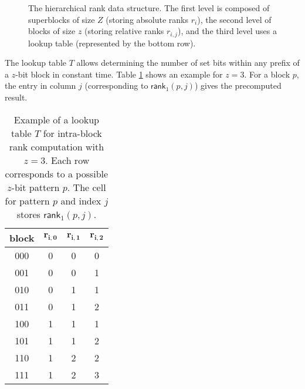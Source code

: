 \begin{figure}[hbtp]
\begin{flushright}
    \end{flushright}
    \caption{The hierarchical \textsf{rank} data structure. The first level is composed of superblocks of size $Z$ (storing absolute ranks $r_i$), the second level of blocks of size $z$ (storing relative ranks $r_{i,j}$), and the third level uses a lookup table (represented by the bottom row).} \label{fig:RRR}
\end{figure}


The lookup table $T$ allows determining the number of set bits within any prefix of a $z$-bit block in constant time. Table \ref{tab:lookup} shows an example for $z=3$. For a block $p$, the entry in column $j$ (corresponding to $\textsf{rank}_1(p, j)$) gives the precomputed result.

\begin{table}[h]
    \centering
    \begin{tabular}{|c|c|c|c|}
        \hline
        block & $\mathbf{r_{i,0}}$ & $\mathbf{r_{i,1}}$ & $\mathbf{r_{i,2}}$ \\
        \hline
        000   & 0                  & 0                  & 0                  \\
        001   & 0                  & 0                  & 1                  \\
        010   & 0                  & 1                  & 1                  \\
        011   & 0                  & 1                  & 2                  \\
        100   & 1                  & 1                  & 1                  \\
        101   & 1                  & 1                  & 2                  \\
        110   & 1                  & 2                  & 2                  \\
        111   & 1                  & 2                  & 3                  \\
        \hline
    \end{tabular}
    \caption{Example of a lookup table $T$ for intra-block rank computation with $z = 3$. Each row corresponds to a possible $z$-bit pattern $p$. The cell for pattern $p$ and index $j$ stores $\textsf{rank}_1(p, j)$.} \label{tab:lookup}
\end{table}


